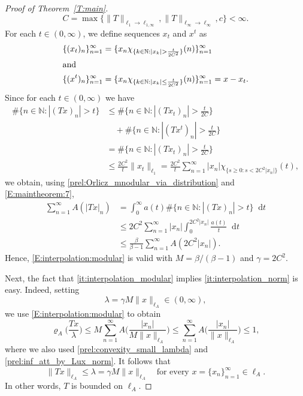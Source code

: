 \documentclass[nointlimits]{amsart}
\numberwithin{equation}{section}
\theoremstyle{plain}
\theoremstyle{definition}
\newcommand{\N}{\mathbb{N}}
\newcommand{\lA}{\ell_A}
\newcommand{\rA}{\varrho_A}
\newcommand*\dd{\mathop{}\!\mathrm{d}}
\begin{document}
\begin{proof}[Proof of Theorem~\ref{T:main}]
\begin{equation*}
    C = \max\{\|T\|_{\ell_1\to \ell_{1, \infty}}, \|T\|_{\ell_\infty \to \ell_\infty}, c\} < \infty.
\end{equation*}
For each $t\in(0,\infty)$, we define sequences $x_t$ and $x^t$ as
\begin{align*}
    \{(x_t)_n\}_{n = 1}^\infty &= \{x_n\chi_{\{k\in\N: |x_k| > \frac{t}{2C^2}\}}(n)\}_{n=1}^\infty \\
    \intertext{and}
    \{(x^t)_n\}_{n = 1}^\infty &= \{x_n\chi_{\{k\in\N: |x_k| \leq \frac{t}{2C^2}\}}(n)\}_{n=1}^\infty = x - x_t.
\end{align*}
Since for each $t\in(0, \infty)$ we have
\begin{align*}
    \#\{n\in\N: |(Tx)_n| > t\} &\leq \#\Big\{ n\in\N: |(Tx_t)_n| > \frac{t}{2C} \Big\} \\
    &\quad+ \#\Big\{ n\in\N: |(Tx^t)_n| > \frac{t}{2C} \Big\} \\
    &= \#\Big\{ n\in\N: |(Tx_t)_n| > \frac{t}{2C} \Big\} \\
    &\leq \frac{2C^2}{t} \|x_t\|_{\ell_1} = \frac{2C^2}{t} \sum_{n = 1}^\infty |x_n|\chi_{\{s\geq0: s<2C^2|x_n|\}}(t),
\end{align*}
we obtain, using \eqref{prel:Orlicz_mnodular_via_distribution} and \eqref{E:maintheorem:7},
\begin{align*}
    \sum_{n = 1}^\infty A(|Tx|_n) &= \int_0^\infty a(t) \#\{n\in\N: |(Tx)_n| > t\} \dd t \\
    &\leq 2C^2 \sum_{n = 1}^\infty |x_n| \int_0^{2C^2|x_n|} \frac{a(t)}{t} \dd t \\
    &\leq \frac{\beta}{\beta - 1} \sum_{n = 1}^\infty A(2C^2 |x_n|).
\end{align*}
Hence, \eqref{E:interpolation:modular} is valid with $M = \beta/(\beta - 1)$ and $\gamma = 2C^2$.

Next, the fact that \ref{it:interpolation_modular} implies \ref{it:interpolation_norm} is easy. Indeed, setting
\begin{equation*}
    \lambda = \gamma M \|x\|_{\lA} \in(0, \infty),
\end{equation*}
we use \eqref{E:interpolation:modular} to obtain
\begin{equation*}
    \rA\Big( \frac{Tx}{\lambda} \Big) \leq M \sum_{n = 1}^\infty A\Big( \frac{|x_n|}{M \|x\|_{\lA}} \Big) \leq \sum_{n = 1}^\infty A\Big( \frac{|x_n|}{\|x\|_{\lA}} \Big) \leq 1,
\end{equation*}
where we also used \eqref{prel:convexity_small_lambda} and \eqref{prel:inf_att_by_Lux_norm}. It follows that
\begin{equation*}
    \|Tx\|_{\lA} \leq \lambda = \gamma M \|x\|_{\lA} \quad \text{for every $x=\{x_n\}_{n=1}^\infty\in\lA$}.
\end{equation*}
In other words, $T$ is bounded on $\lA$.


\end{proof}
\end{document}
